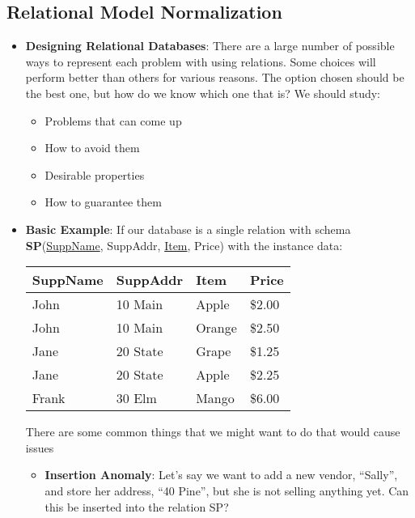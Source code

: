 \documentclass{report}
\begin{document}
    \pagebreak 
    \subsection{Relational Model Normalization}
    \begin{itemize}
        \item \textbf{Designing Relational Databases}: There are a large number of possible ways to represent each problem with using relations. Some choices will perform better than others for various reasons. The option chosen should be the best one, but how do we know which one that is?
            \bigbreak \noindent 
            We should study:
            \begin{itemize}
                \item Problems that can come up
                \item How to avoid them
                \item Desirable properties
                \item How to guarantee them
            \end{itemize}
        \item \textbf{Basic Example}: If our database is a single relation with schema \textbf{SP}(\underline{SuppName}, SuppAddr, \underline{Item}, Price) with the instance data:
            \bigbreak \noindent 
            \begin{center}
                \begin{tabular}{|l|l|l|l|}
                    \hline
                    \textbf{SuppName} & \textbf{SuppAddr} & \textbf{Item} & \textbf{Price} \\ \hline
                    John    & 10 Main   & Apple   & \$2.00  \\ \hline
                    John    & 10 Main   & Orange  & \$2.50  \\ \hline
                    Jane    & 20 State  & Grape   & \$1.25  \\ \hline
                    Jane    & 20 State  & Apple   & \$2.25  \\ \hline
                    Frank   & 30 Elm    & Mango   & \$6.00  \\ \hline
                \end{tabular}
            \end{center}
            \bigbreak \noindent 
            There are some common things that we might want to do that would cause issues
            \begin{itemize}
                \item \textbf{Insertion Anomaly}: Let’s say we want to add a new vendor, “Sally”, and store her address, “40 Pine”, but she is not selling anything yet. Can this be inserted into the relation SP?

\end{itemize}
\end{itemize}
\end{document}
